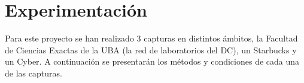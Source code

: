 \section{Experimentación}
Para este proyecto se han realizado 3 capturas en distintos ámbitos, la Facultad de Ciencias Exactas de la UBA (la red de laboratorios del DC), un Starbucks y un Cyber. A continuación se presentarán los métodos y condiciones de cada una de las capturas.